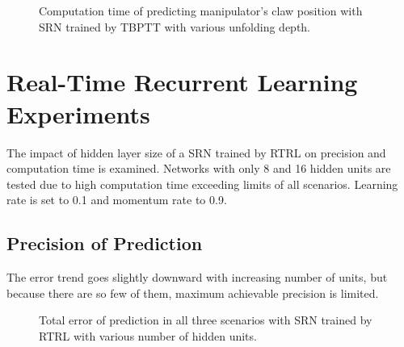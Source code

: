 \documentclass[12pt,oneside]{fithesis2}
\begin{document}
\begin{figure}[H]
\centering
\caption{Computation time of predicting manipulator's claw position with SRN trained by TBPTT with various unfolding depth.}
\end{figure}

\section{Real-Time Recurrent Learning Experiments}
The impact of hidden layer size of a SRN trained by RTRL on precision and computation time is examined. Networks with only 8 and 16 hidden units are tested due to high computation time exceeding limits of all scenarios. Learning rate is set to 0.1 and momentum rate to 0.9. 

\subsection{Precision of Prediction}
The error trend goes slightly downward with increasing number of units, but because there are so few of them, maximum achievable precision is limited.

\begin{figure}[H]
\centering
\caption{Total error of prediction in all three scenarios with SRN trained by RTRL with various number of hidden units.}
\end{figure}
\end{document}

